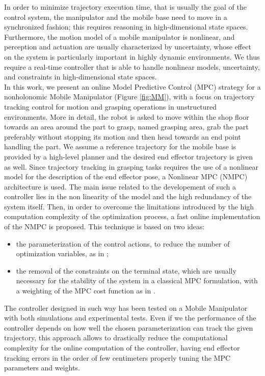 In order to minimize trajectory execution time, that is usually the goal of the control system, the manipulator and the mobile base need to move in a synchronized fashion; this requires reasoning in high-dimensional state spaces.
Furthermore, the motion model of a mobile manipulator is nonlinear, and perception and actuation are usually characterized by uncertainty, whose effect on the system is particularly important in highly dynamic environments.
We thus require a real-time controller that is able to handle nonlinear models, uncertainty, and constraints in high-dimensional state spaces.\\
In this work, we present an online Model Predictive Control (MPC) strategy for a nonholonomic Mobile Manipulator (Figure \ref{fig:MM}), with a focus on trajectory tracking control for motion and grasping operations in unstructured environments. More in detail, the robot is asked to move within the shop floor towards an area around the part to grasp, named grasping area, grab the part preferably without stopping its motion and then head towards an end point handling the part.
We assume a reference trajectory for the mobile base is provided by a high-level planner%
and the desired end effector trajectory is given as well. Since trajectory tracking in grasping tasks requires the use of a nonlinear model for the description of the end effector pose, a Nonlinear MPC (NMPC) architecture is used. The main issue related to the developement of such a controller lies in the non linearity of the model and the high redundancy of the system itself. Then, in order to overcome the limitations introduced by the high computation complexity of the optimization process, a fast online implementation of the NMPC is proposed. This technique is based on two ideas:
\begin{itemize}
	\item the parameterization of the control actions, to reduce the number of optimization variables, as in \cite{Howard2007};
	\item the removal of the constraints on the terminal state, which are usually necessary for the stability of the system in a classical MPC formulation, with a weighting of the MPC cost function as in \cite{alamir2018stability}. 
\end{itemize}
The controller designed in such way has been tested on a Mobile Manipulator with both simulations and experimental tests. Even if we the performance of the controller depends on how well the chosen parameterization can track the given trajectory, this approach allows to drastically reduce the computational complexity for the online computation of the controller, having end effector tracking errors in the order of few centimeters properly tuning the MPC parameters and weights.\\
